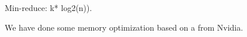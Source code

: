 

    \item Min-reduce: k* log2(n)).


We have done some memory optimization based on a 
from Nvidia.








